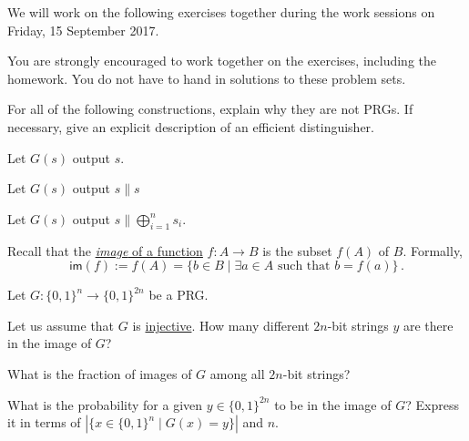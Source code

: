 \documentclass[a4paper,10pt,landscape,twocolumn]{scrartcl}
\newcommand\worksession{Friday, 15 September 2017}
\begin{document}
\problems

{\sffamily\noindent
We will work on the following exercises together during the work sessions on \worksession.

You are strongly encouraged to work together on the exercises, including the homework. You do not have to hand in solutions to these problem sets.}

\begin{exercise}
For all of the following constructions, explain why they are not PRGs. If necessary, give an explicit description of an efficient distinguisher.

\begin{subex}
Let $G(s)$ output $s$.
\end{subex}

\begin{subex}
Let $G(s)$ output $s \| s$
\end{subex}

\begin{subex}
Let $G(s)$ output $s \| \bigoplus_{i=1}^n s_i$.
\end{subex}

\end{exercise}

\begin{exercise}
Recall that the \href{https://en.wikipedia.org/wiki/Image_(mathematics)}{\emph{image} of a function} $f:A \rightarrow B$ is the subset $f(A)$ of $B$. Formally, 
\[ \mathsf{im}(f) := f(A) = \{b \in B \mid \exists a \in A \mbox{ such that } b=f(a) \} \, .
\]

Let $G:\{0,1\}^n \rightarrow \{0,1\}^{2n}$ be a PRG. 

\begin{subex}
Let us assume that $G$ is \href{https://en.wikipedia.org/wiki/Injective_function}{injective}. How many different $2n$-bit strings $y$ are there in the image of $G$?
\end{subex}

\begin{subex}
What is the fraction of images of $G$ among all $2n$-bit strings?
\end{subex}

\begin{subex}
What is the probability for a given $y \in \{0,1\}^{2n}$ to be in the image of $G$? Express it in terms of $|\{x \in \{0,1\}^n \mid G(x)=y\} |$ and $n$.
\end{subex}

\end{exercise}
\end{document}

